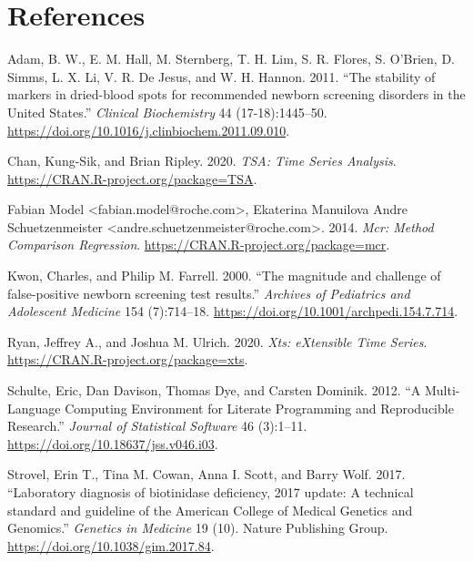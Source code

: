 \documentclass[review]{elsarticle}
\begin{document}
\section*{References}
\label{sec:org73b26e5}
\begin{hangparas}{1.5em}{1}
\hypertarget{citeproc_bib_item_1}{Adam, B. W., E. M. Hall, M. Sternberg, T. H. Lim, S. R. Flores, S. O’Brien, D. Simms, L. X. Li, V. R. De Jesus, and W. H. Hannon. 2011. “The stability of markers in dried-blood spots for recommended newborn screening disorders in the United States.” \textit{Clinical Biochemistry} 44 (17-18):1445–50. \href{https://doi.org/10.1016/j.clinbiochem.2011.09.010}{https://doi.org/10.1016/j.clinbiochem.2011.09.010}.}

\hypertarget{citeproc_bib_item_2}{Chan, Kung-Sik, and Brian Ripley. 2020. \textit{TSA: Time Series Analysis}. \href{https://CRAN.R-project.org/package=TSA}{https://CRAN.R-project.org/package=TSA}.}

\hypertarget{citeproc_bib_item_3}{Fabian Model <fabian.model@roche.com>, Ekaterina Manuilova Andre Schuetzenmeister <andre.schuetzenmeister@roche.com>. 2014. \textit{Mcr: Method Comparison Regression}. \href{https://CRAN.R-project.org/package=mcr}{https://CRAN.R-project.org/package=mcr}.}

\hypertarget{citeproc_bib_item_4}{Kwon, Charles, and Philip M. Farrell. 2000. “The magnitude and challenge of false-positive newborn screening test results.” \textit{Archives of Pediatrics and Adolescent Medicine} 154 (7):714–18. \href{https://doi.org/10.1001/archpedi.154.7.714}{https://doi.org/10.1001/archpedi.154.7.714}.}

\hypertarget{citeproc_bib_item_5}{Ryan, Jeffrey A., and Joshua M. Ulrich. 2020. \textit{Xts: eXtensible Time Series}. \href{https://CRAN.R-project.org/package=xts}{https://CRAN.R-project.org/package=xts}.}

\hypertarget{citeproc_bib_item_6}{Schulte, Eric, Dan Davison, Thomas Dye, and Carsten Dominik. 2012. “A Multi-Language Computing Environment for Literate Programming and Reproducible Research.” \textit{Journal of Statistical Software} 46 (3):1–11. \href{https://doi.org/10.18637/jss.v046.i03}{https://doi.org/10.18637/jss.v046.i03}.}

\hypertarget{citeproc_bib_item_7}{Strovel, Erin T., Tina M. Cowan, Anna I. Scott, and Barry Wolf. 2017. “Laboratory diagnosis of biotinidase deficiency, 2017 update: A technical standard and guideline of the American College of Medical Genetics and Genomics.” \textit{Genetics in Medicine} 19 (10). Nature Publishing Group. \href{https://doi.org/10.1038/gim.2017.84}{https://doi.org/10.1038/gim.2017.84}.}


\end{hangparas}
\end{document}
